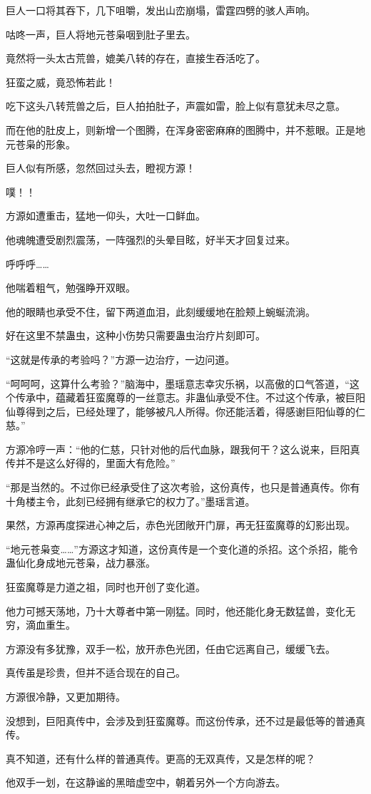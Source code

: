 \begin{this_body}
巨人一口将其吞下，几下咀嚼，发出山峦崩塌，雷霆四劈的骇人声响。

咕咚一声，巨人将地元苍枭咽到肚子里去。

竟然将一头太古荒兽，媲美八转的存在，直接生吞活吃了。

狂蛮之威，竟恐怖若此！

吃下这头八转荒兽之后，巨人拍拍肚子，声震如雷，脸上似有意犹未尽之意。

而在他的肚皮上，则新增一个图腾，在浑身密密麻麻的图腾中，并不惹眼。正是地元苍枭的形象。

巨人似有所感，忽然回过头去，瞪视方源！

噗！！

方源如遭重击，猛地一仰头，大吐一口鲜血。

他魂魄遭受剧烈震荡，一阵强烈的头晕目眩，好半天才回复过来。

呼呼呼……

他喘着粗气，勉强睁开双眼。

他的眼睛也承受不住，留下两道血泪，此刻缓缓地在脸颊上蜿蜒流淌。

好在这里不禁蛊虫，这种小伤势只需要蛊虫治疗片刻即可。

“这就是传承的考验吗？”方源一边治疗，一边问道。

“呵呵呵，这算什么考验？”脑海中，墨瑶意志幸灾乐祸，以高傲的口气答道，“这个传承中，蕴藏着狂蛮魔尊的一丝意志。非蛊仙承受不住。不过这个传承，被巨阳仙尊得到之后，已经处理了，能够被凡人所得。你还能活着，得感谢巨阳仙尊的仁慈。”

方源冷哼一声：“他的仁慈，只针对他的后代血脉，跟我何干？这么说来，巨阳真传并不是这么好得的，里面大有危险。”

“那是当然的。不过你已经承受住了这次考验，这份真传，也只是普通真传。你有十角楼主令，此刻已经拥有继承它的权力了。”墨瑶言道。

果然，方源再度探进心神之后，赤色光团敞开门扉，再无狂蛮魔尊的幻影出现。

“地元苍枭变……”方源这才知道，这份真传是一个变化道的杀招。这个杀招，能令蛊仙化身成地元苍枭，战力暴涨。

狂蛮魔尊是力道之祖，同时也开创了变化道。

他力可撼天荡地，乃十大尊者中第一刚猛。同时，他还能化身无数猛兽，变化无穷，滴血重生。

方源没有多犹豫，双手一松，放开赤色光团，任由它远离自己，缓缓飞去。

真传虽是珍贵，但并不适合现在的自己。

方源很冷静，又更加期待。

没想到，巨阳真传中，会涉及到狂蛮魔尊。而这份传承，还不过是最低等的普通真传。

真不知道，还有什么样的普通真传。更高的无双真传，又是怎样的呢？

他双手一划，在这静谧的黑暗虚空中，朝着另外一个方向游去。

\end{this_body}

